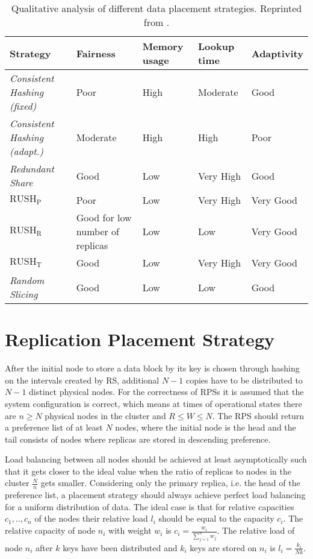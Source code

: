 \begin{table}
\begin{tabularx}{\textwidth}{|l|X|X|X|X|}
\hline
Strategy & Fairness & Memory usage & Lookup time & Adaptivity\\
\hline
\emph{Consistent Hashing (fixed)} & Poor & High & Moderate & Good\\
\emph{Consistent Hashing (adapt.)} & Moderate & High & High & Poor\\
\emph{Redundant Share} & Good & Low & Very High & Good\\
\emph{$\text{RUSH}_\text{P}$} & Poor & Low & Very High & Very Good\\
\emph{$\text{RUSH}_\text{R}$} & Good for low number of replicas & Low & Low &Very Good\\
\emph{$\text{RUSH}_\text{T}$} & Good & Low & Very High & Very Good\\
\emph{Random Slicing} & Good & Low & Low & Good\\\hline
\end{tabularx}
\caption[Qualitative analysis of different data placement strategies]{Qualitative analysis of different data placement strategies. Reprinted from \cite{Miranda2014}.}
\label{tab:random_slicing_analysis}
\end{table}

\section{Replication Placement Strategy}
\label{sec:replication_placement_strategy}
After the initial node to store a data block by its key is chosen through hashing on the intervals created by \ac{RS}, additional $N-1$ copies have to be distributed to $N-1$ distinct physical nodes.
For the correctness of \acp{RPS} it is assumed that the system configuration is correct, which means at times of operational states there are $n \geq N$ physical nodes in the cluster and $R \leq W \leq N$.
The \ac{RPS} should return a preference list of at least $N$ nodes, where the initial node is the head and the tail consists of nodes where replicas are stored in descending preference.

Load balancing between all nodes should be achieved at least asymptotically such that it gets closer to the ideal value when the ratio of replicas to nodes in the cluster $\frac{N}{n}$ gets smaller.
Considering only the primary replica, i.e. the head of the preference list, a placement strategy should always achieve perfect load balancing for a uniform distribution of data.
The ideal case is that for relative capacities $c_1,..,c_n$ of the nodes their relative load $l_i$ should be equal to the capacity $c_i$.
The relative capacity of node $n_i$ with weight $w_i$ is $c_i = \frac{w_i}{\sum_{j=1}^{n}w_j}$.
The relative load of node $n_i$ after $k$ keys have been distributed and $k_i$ keys are stored on $n_i$ is $l_i = \frac{k_i}{Nk}$.

